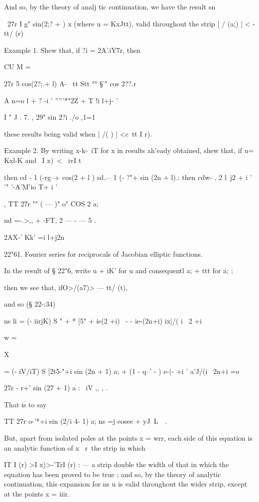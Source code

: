 And so, by the theory of analj tic continuation, we have the result sn

\ 27r I g" sin(2;? + ) x (where u = KxJtt), valid throughout the strip
[ / (a;) | < - tt/ (r)

Example 1. Shew that, if ?i = 2A'.iY7r, then

CU M =

27r 5 cos(2?;.+ l) A- \ tt Stt °° §'" cos 2??.r

A n=o l + ? -i ' '''''*"2Z + T !i l+j- '

I " J . 7. , 29" sin 2?i ./o ,1=1 %

these results being valid when | /( ) | <c\ tt I r).

Example 2. By writing x-k-\ iT for x in results ah'eady obtained, shew
that, if u= Kxl-K and \ I x)\ < \ ivI t\

then cd - 1 (-rg--+ cos(2 + l ) sd..-- 1 (- ?"+ sin (2n + l).: then
cdw- , 2 l\ j2 + i ' '" '-A'M'io T+ i '

, TT 27r "" ( — )" o" COS 2 a;

nd =-.>,, + -FT, 2 — - — 5 .

2AX-' Kk' =i l+j2n

22"61. Fourier series for reciprocals of Jacobian elliptic functions.

In the result of § 22"6, write u + iK' for u and consequentl a; + ttt
for a; ;

then we see that, ifO>/(a7)> — tt/ (t),

and so (§ 22-:34)

ns li = (- iirjK) S " + * [5" + ie(2 +i) \ - - ie-(2n+i) ix|/( i \ 2
+i

w =

X

= (- iV/iT) S [2t5-"+i sin (2n + 1) a; + (1 - q--' - ) e-(- +i '
a'J/(i \ 2n+i =o

  27r - r+' sin (27 + 1) a : \ iV ,, , .

That is to say

TT 27r o-'*+i sin (2/i 4- 1) a; ns =j eosee + yJ\ L\ \ .

But, apart from isolated poles at the points x = wrr, each side of
this equation is an analytic function of x \ r\ the strip in which

IT I (r) >I x)>-'TrI (r) : — a strip double the width of that in which
the equation has been proved to be true ; and so, by the theory of
analytic continuation, this expansion for ns u is valid throughout the
wider strip, except at the points x = iiir.

